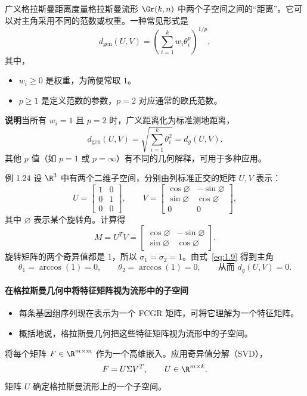 广义格拉斯曼距离度量格拉斯曼流形 $\Gr(k,n)$ 中两个子空间之间的“距离”。它可以对主角采用不同的范数或权重。一种常见形式是
\begin{equation*}
  d_{\mathrm{gen}}(U,V)=\left(\sum_{i=1}^kw_i\theta_i^p\right)^{1/p},
  \tag{1.11}\label{eq:1.11}
\end{equation*}
其中，
\begin{itemize}
  \item $w_i\ge0$ 是权重，为简便常取 $1$。
  \item $p\ge1$ 是定义范数的参数，$p=2$ 对应通常的欧氏范数。
\end{itemize}
\textbf{说明}\quad 当所有 $w_i=1$ 且 $p=2$ 时，广义距离化为标准测地距离，
\[
  d_{\mathrm{gen}}(U,V)=\sqrt{\sum_{i=1}^k\theta_i^2}=d_g(U,V).
\]
其他 $p$ 值（如 $p=1$ 或 $p=\infty$）有不同的几何解释，可用于多种应用。

\begin{statement}{例 1.24}{}
设 $\R^3$ 中有两个二维子空间，分别由列标准正交的矩阵 $U,V$ 表示：
\[
  U=\begin{bmatrix}1&0\\0&1\\0&0\end{bmatrix},\qquad
  V=\begin{bmatrix}
    \cos\varnothing&-\sin\varnothing\\
    \sin\varnothing&\cos\varnothing\\
    0&0
  \end{bmatrix},
\]
其中 $\varnothing$ 表示某个旋转角。计算得
\[
  M=U^TV=\begin{bmatrix}
    \cos\varnothing&-\sin\varnothing\\
    \sin\varnothing&\cos\varnothing
  \end{bmatrix}.
\]
旋转矩阵的两个奇异值都是 $1$，所以 $\sigma_1=\sigma_2=1$。由式~\eqref{eq:1.9} 得到主角
\[
  \theta_1=\arccos(1)=0,\qquad
  \theta_2=\arccos(1)=0,\qquad
  \text{从而 }d_g(U,V)=0.
\]
\end{statement}

\paragraph{在格拉斯曼几何中将特征矩阵视为流形中的子空间}
\begin{itemize}
  \item 每条基因组序列现在表示为一个 FCGR 矩阵，可将它理解为一个特征矩阵。
  \item 概括地说，格拉斯曼几何把这些特征矩阵视为流形中的子空间。
\end{itemize}
将每个矩阵 $F\in\R^{m\times m}$ 作为一个高维嵌入。应用奇异值分解（SVD），
\[
  F=U\Sigma V^T,\qquad U\in\R^{m\times k}.
\]
矩阵 $U$ 确定格拉斯曼流形上的一个子空间。

